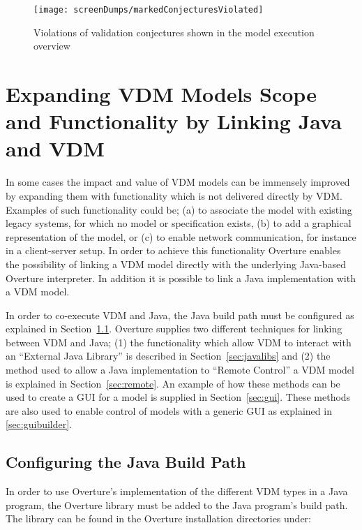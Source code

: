\documentclass{overturerepchap}
\begin{document}
\begin{figure}[htp]
\begin{center}
  \texttt{[image: screenDumps/markedConjecturesViolated]}
  \caption{Violations of validation conjectures shown in the model execution overview}
  \label{fig:userguide:markedConjecturesViolated}
\end{center}
\end{figure}






\chapter{Expanding VDM Models Scope and Functionality by Linking Java and VDM} \label{sec:linkToJava}

In some cases the impact and value of VDM models can be immensely
improved by expanding them with functionality which is not delivered
directly by VDM. Examples of such functionality could be; (a) to
associate the model with existing legacy systems, for which no model
or specification exists, (b) to add a graphical representation of the
model, or (c) to enable network communication, for instance in a
client-server setup.  In order to achieve this functionality Overture
enables the possibility of linking a VDM model directly with the
underlying Java-based Overture interpreter. In addition it is possible
to link a
Java implementation with a VDM model.

In order to co-execute VDM and Java, the Java build path must be configured as explained in Section~\ref{sec:java-build-path}. Overture supplies two different techniques for linking between VDM and Java; (1) the functionality which allow VDM to interact with an ``External Java Library'' is described in Section~\ref{sec:javalibs} and (2) the method used to allow a Java implementation to ``Remote Control'' a VDM model is explained in Section~\ref{sec:remote}. An example of how these methods can be used to create a GUI for a model is supplied in Section~\ref{sec:gui}. These methods are also used to enable control of models with a generic
GUI as explained in \autoref{sec:guibuilder}.

\section{Configuring the Java Build Path}
\label{sec:java-build-path}

In order to use Overture's implementation of the different VDM types in a Java program, the Overture library must be added to the Java program's build path. The library can be found in the Overture installation directories under:
\end{document}
